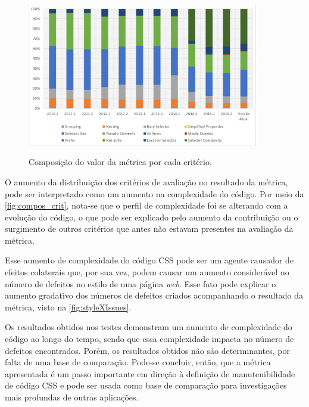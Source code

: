 \begin{figure}[!htb]
	\centering
	\caption{Composição do valor da métrica por cada critério.}
	\includegraphics[width=0.9\textwidth]{./04-figuras/composition_criteria}
	\label{fig:compos_crit}
\end{figure}

O aumento da distribuição dos critérios de avaliação no resultado da métrica, pode ser interpretado como um aumento na complexidade do código. Por meio da \autoref{fig:compos_crit}, nota-se que o perfil de complexidade foi se alterando com a evolução do código, o que pode ser explicado pelo aumento da contribuição ou o surgimento de outros critérios que antes não estavam presentes na avaliação da métrica.

Esse aumento de complexidade do código CSS pode ser um agente causador de efeitos colaterais que, por sua vez, podem causar um aumento considerável no número de defeitos no estilo de uma página \textit{web}. Esse fato pode explicar o aumento gradativo dos números de defeitos criados acompanhando o resultado da métrica, visto na \autoref{fig:styleXIssues}.

Os resultados obtidos nos testes demonstram um aumento de complexidade do código ao longo do tempo, sendo que essa complexidade impacta no número de defeitos encontrados. Porém, os resultados obtidos não são determinantes, por falta de uma base de comparação. Pode-se concluir, então, que a métrica apresentada é um passo importante em direção à definição de manutenibilidade de código CSS e pode ser usada como base de comparação para investigações mais profundas de outras aplicações.